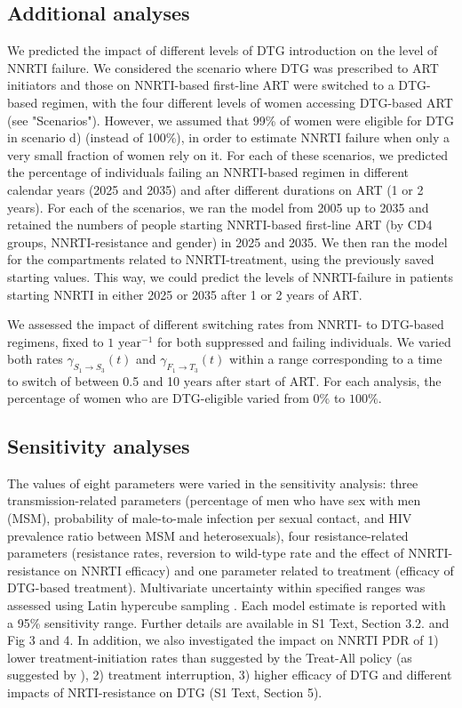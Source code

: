 \documentclass[10pt,letterpaper]{article}
\begin{document}
\subsection*{Additional analyses}
We predicted the impact of different levels of DTG introduction on the level of NNRTI failure. We considered the scenario where DTG was prescribed to ART initiators and those on NNRTI-based first-line ART were switched to a DTG-based regimen, with the four different levels of women accessing DTG-based ART (see "Scenarios"). However, we assumed that 99\% of women were eligible for DTG in scenario d) (instead of 100\%), in order to estimate NNRTI failure when only a very small fraction of women rely on it. For each of these scenarios, we predicted the percentage of individuals failing an NNRTI-based regimen in different calendar years (2025 and 2035) and after different durations on ART (1 or 2 years). For each of the scenarios, we ran the model from 2005 up to 2035 and retained the numbers of people starting NNRTI-based first-line ART (by CD4 groups, NNRTI-resistance and gender) in 2025 and 2035. We then ran the model for the compartments related to NNRTI-treatment, using the previously saved starting values. This way, we could predict the levels of NNRTI-failure in patients starting NNRTI in either 2025 or 2035 after 1 or 2 years of ART.

We assessed the impact of different switching rates from NNRTI- to DTG-based regimens, fixed to $1 \text{ year}^{-1}$ for both suppressed and failing individuals. We varied both rates $\gamma_{S_1\rightarrow S_3}^{}(t)$ and $\gamma_{F_1\rightarrow T_3}^{}(t)$ within a range corresponding to a time to switch of between 0.5 and 10 $\text{years}$  after start of ART. For each analysis, the percentage of women who are DTG-eligible varied from $0\%$ to $100\%$.

\subsection*{Sensitivity analyses}
The values of eight parameters were varied in the sensitivity analysis: three transmission-related parameters (percentage of men who have sex with men (MSM), probability of male-to-male infection per sexual contact, and HIV prevalence ratio between MSM and heterosexuals), four resistance-related parameters (resistance rates, reversion to wild-type rate and the effect of NNRTI-resistance on NNRTI efficacy) and one parameter related to treatment (efficacy of DTG-based treatment). Multivariate uncertainty within specified ranges was assessed using Latin hypercube sampling \cite{Seaholm1988}. Each model estimate is reported with a 95\% sensitivity range. Further details are available in S1 Text, Section 3.2. and Fig 3 and 4.
In addition, we also investigated the impact on NNRTI PDR of 1) lower treatment-initiation rates than suggested by the Treat-All policy (as suggested by \cite{Boyer2016}), 2) treatment interruption, 3) higher efficacy of DTG and different impacts of NRTI-resistance on DTG (S1 Text, Section 5).
\end{document}
